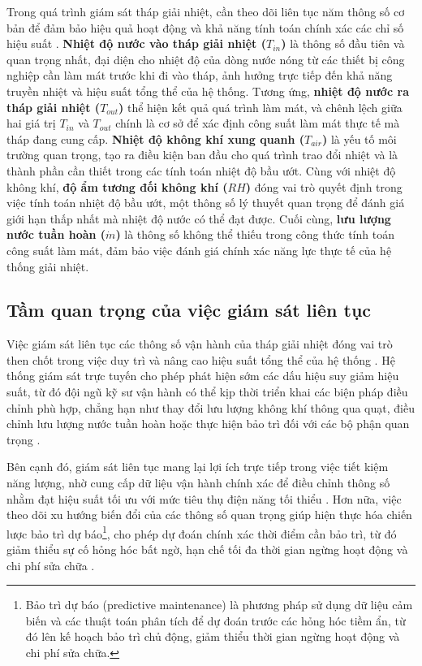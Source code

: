 \documentclass[../main.tex]{subfiles}
\begin{document}
Trong quá trình giám sát tháp giải nhiệt, cần theo dõi liên tục năm thông số cơ bản để đảm bảo hiệu quả hoạt động và khả năng tính toán chính xác các chỉ số hiệu suất \cite{ashrae2020cooling}. \textbf{Nhiệt độ nước vào tháp giải nhiệt ($T_{in}$)} là thông số đầu tiên và quan trọng nhất, đại diện cho nhiệt độ của dòng nước nóng từ các thiết bị công nghiệp cần làm mát trước khi đi vào tháp, ảnh hưởng trực tiếp đến khả năng truyền nhiệt và hiệu suất tổng thể của hệ thống. Tương ứng, \textbf{nhiệt độ nước ra tháp giải nhiệt ($T_{out}$)} thể hiện kết quả quá trình làm mát, và chênh lệch giữa hai giá trị $T_{in}$ và $T_{out}$ chính là cơ sở để xác định công suất làm mát thực tế mà tháp đang cung cấp. \textbf{Nhiệt độ không khí xung quanh ($T_{air}$)} là yếu tố môi trường quan trọng, tạo ra điều kiện ban đầu cho quá trình trao đổi nhiệt và là thành phần cần thiết trong các tính toán nhiệt độ bầu ướt. Cùng với nhiệt độ không khí, \textbf{độ ẩm tương đối không khí ($RH$)} đóng vai trò quyết định trong việc tính toán nhiệt độ bầu ướt, một thông số lý thuyết quan trọng để đánh giá giới hạn thấp nhất mà nhiệt độ nước có thể đạt được. Cuối cùng, \textbf{lưu lượng nước tuần hoàn ($\dot{m}$)} là thông số không thể thiếu trong công thức tính toán công suất làm mát, đảm bảo việc đánh giá chính xác năng lực thực tế của hệ thống giải nhiệt.

\subsection{Tầm quan trọng của việc giám sát liên tục}
\label{sec:continuous_monitoring_importance}

Việc giám sát liên tục các thông số vận hành của tháp giải nhiệt đóng vai trò then chốt trong việc duy trì và nâng cao hiệu suất tổng thể của hệ thống \cite{ashrae2020cooling,nguyen2022iot}. Hệ thống giám sát trực tuyến cho phép phát hiện sớm các dấu hiệu suy giảm hiệu suất, từ đó đội ngũ kỹ sư vận hành có thể kịp thời triển khai các biện pháp điều chỉnh phù hợp, chẳng hạn như thay đổi lưu lượng không khí thông qua quạt, điều chỉnh lưu lượng nước tuần hoàn hoặc thực hiện bảo trì đối với các bộ phận quan trọng \cite{wang2023smart}. 

Bên cạnh đó, giám sát liên tục mang lại lợi ích trực tiếp trong việc tiết kiệm năng lượng, nhờ cung cấp dữ liệu vận hành chính xác để điều chỉnh thông số nhằm đạt hiệu suất tối ưu với mức tiêu thụ điện năng tối thiểu \cite{iea2023digitalization}. Hơn nữa, việc theo dõi xu hướng biến đổi của các thông số quan trọng giúp hiện thực hóa chiến lược bảo trì dự báo\footnote{Bảo trì dự báo (predictive maintenance) là phương pháp sử dụng dữ liệu cảm biến và các thuật toán phân tích để dự đoán trước các hỏng hóc tiềm ẩn, từ đó lên kế hoạch bảo trì chủ động, giảm thiểu thời gian ngừng hoạt động và chi phí sửa chữa.}, cho phép dự đoán chính xác thời điểm cần bảo trì, từ đó giảm thiểu sự cố hỏng hóc bất ngờ, hạn chế tối đa thời gian ngừng hoạt động và chi phí sửa chữa \cite{kumar2023edge}. 
\end{document}
